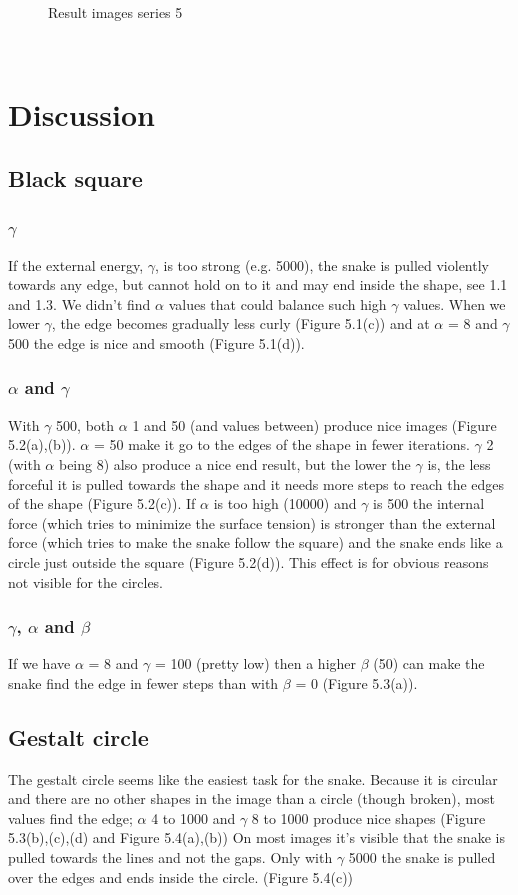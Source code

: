 \documentclass[paper=a4, fontsize=11pt]{scrartcl} %
\numberwithin{equation}{section} %
\numberwithin{figure}{section} %
\numberwithin{table}{section} %
\begin{document}
\begin{figure}[H]
        \caption{Result images series 5 }\label{fig:animals}
\end{figure}

\

\section{Discussion}
\subsection{Black square}
\subsubsection{$\gamma$}
If the external energy, $\gamma$, is too strong (e.g. 5000), the snake is pulled violently towards any edge, but cannot hold on to it and may end inside the shape, see 1.1 and 1.3. We didn't find $\alpha$ values that could balance such high $\gamma$ values. When we lower $\gamma$, the edge becomes gradually less curly (Figure 5.1(c)) and at $\alpha$ = 8 and $\gamma$ 500 the edge is nice and smooth (Figure 5.1(d)).
\
\subsubsection{$\alpha$ and $\gamma$}
With $\gamma$ 500, both $\alpha$ 1 and 50 (and values between) produce nice images (Figure 5.2(a),(b)). $\alpha$ = 50 make it go to the edges of the shape in fewer iterations. $\gamma$ 2 (with $\alpha$ being 8) also produce a nice end result, but the lower the $\gamma$ is, the less forceful it is pulled towards the shape and it needs more steps to reach the edges of the shape (Figure 5.2(c)). If $\alpha$ is too high (10000) and $\gamma$ is 500 the internal force (which tries to minimize the surface tension) is stronger than the external force (which tries to make the snake follow the square) and the snake ends like a circle just outside the square (Figure 5.2(d)). This effect is for obvious reasons not visible for the circles.\\
\subsubsection{$\gamma$, $\alpha$ and $\beta$}
If we have $\alpha$ = 8 and $\gamma$ = 100 (pretty low) then a higher $\beta$ (50) can make the snake find the edge in fewer steps than with $\beta$ = 0 (Figure 5.3(a)). 
\
\subsection{Gestalt circle}
The gestalt circle seems like the easiest task for the snake. Because it is circular and there are no other shapes in the image than a circle (though broken), most values find the edge; $\alpha$ 4 to 1000 and $\gamma$ 8 to 1000 produce nice shapes (Figure 5.3(b),(c),(d) and Figure 5.4(a),(b))  On most images it's visible that the snake is pulled towards the lines and not the gaps. Only with $\gamma$ 5000 the snake is pulled over the edges and ends inside the circle. (Figure 5.4(c)) 
\
\end{document}
